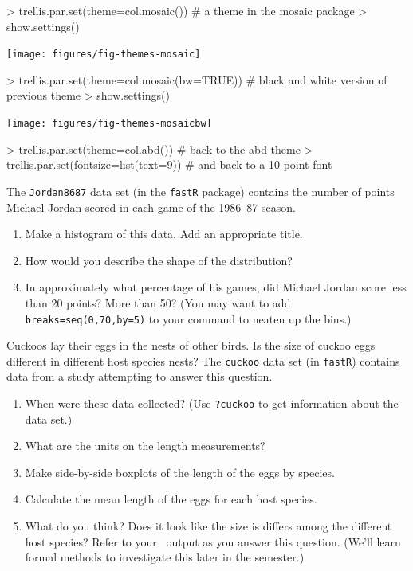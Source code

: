 \begin{Schunk}
\begin{Sinput}
> trellis.par.set(theme=col.mosaic())        # a theme in the mosaic package
> show.settings()
\end{Sinput}
\end{Schunk}
\texttt{[image: figures/fig-themes-mosaic]}

\begin{Schunk}
\begin{Sinput}
> trellis.par.set(theme=col.mosaic(bw=TRUE)) # black and white version of previous theme
> show.settings()
\end{Sinput}
\end{Schunk}
\texttt{[image: figures/fig-themes-mosaicbw]}

\begin{Schunk}
\begin{Sinput}
> trellis.par.set(theme=col.abd())          # back to the abd theme
> trellis.par.set(fontsize=list(text=9))    # and back to a 10 point font
\end{Sinput}
\end{Schunk}

\begin{problem}
The \verb!Jordan8687! data set (in the \verb!fastR! package) contains the number 
of points Michael Jordan scored in each game of the 1986--87 season.  
\begin{enumerate}
\item
Make a histogram of this data.  Add an appropriate title.
\item
How would you describe the shape of the distribution?
\item
In approximately what percentage of his games, did Michael Jordan score less than 20 points?
More than 50?
(You may want to add \verb!breaks=seq(0,70,by=5)! to your command to neaten up
the bins.)
\end{enumerate}
\end{problem}

\begin{problem}
Cuckoos lay their eggs in the nests of other birds.  Is the size of cuckoo eggs different
in different host species nests?  The \verb!cuckoo! data set (in \verb!fastR!)
contains data from a study attempting to answer this question.
\begin{enumerate}
\item
When were these data collected?  (Use \verb!?cuckoo! to get information about the data set.)
\item
What are the units on the length measurements?
\item
Make side-by-side boxplots of the length of the eggs by species.
\item
Calculate the mean length of the eggs for each host species.
\item
What do you think?  Does it look like the size is differs among the different host
species?  Refer to your \R\ output as you answer this question.
(We'll learn formal methods to investigate this later in the semester.)
\end{enumerate}
\vspace{-5mm}
\end{problem}

